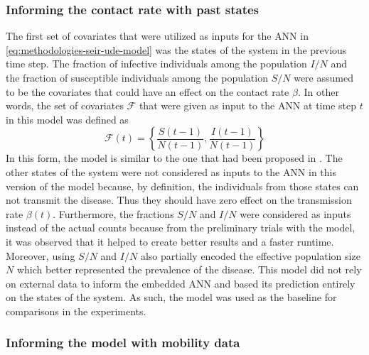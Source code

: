 \subsubsection{Informing the contact rate with past states}
The first set of covariates that were utilized as inputs for the \gls{ANN} in \autoref{eq:methodologies-seir-ude-model} was the states of the system in the previous time step.
The fraction of infective individuals among the population $I/N$ and the fraction of susceptible individuals among the population $S/N$ were assumed to be the covariates that could have an effect on the contact rate $\beta$.
In other words, the set of covariates $\mathcal{F}$ that were given as input to the \gls{ANN} at time step $t$ in this model was defined as
\begin{equation*}
    \mathcal{F}(t) = \left\lbrace \frac{S(t-1)}{N(t-1)}, \frac{I(t-1)}{N(t-1)} \right\rbrace
\end{equation*}
In this form, the model is similar to the one that had been proposed in \cite{dandekarMachineLearningAidedGlobal2020a}.
The other states of the system were not considered as inputs to the \gls{ANN} in this version of the model because, by definition, the individuals from those states can not transmit the disease.
Thus they should have zero effect on the transmission rate $\beta(t)$.
Furthermore, the fractions $S/N$ and $I/N$ were considered as inputs instead of the actual counts because from the preliminary trials with the model, it was observed that it helped to create better results and a faster runtime.
Moreover, using $S/N$ and $I/N$ also partially encoded the effective population size $N$ which better represented the prevalence of the disease.
This model did not rely on external data to inform the embedded \gls{ANN} and based its prediction entirely on the states of the system.
As such, the model was used as the baseline for comparisons in the experiments.

\subsubsection{Informing the model with mobility data}

